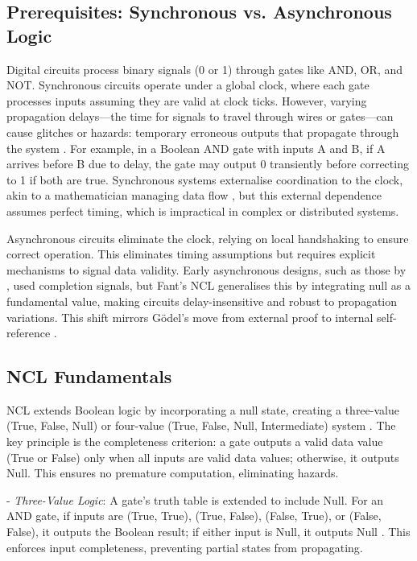 \documentclass{article}
\begin{document}
\subsection{Prerequisites: Synchronous vs. Asynchronous Logic}
Digital circuits process binary signals (0 or 1) through gates like AND, OR, and NOT. Synchronous circuits operate under a global clock, where each gate processes inputs assuming they are valid at clock ticks. However, varying propagation delays---the time for signals to travel through wires or gates---can cause glitches or hazards: temporary erroneous outputs that propagate through the system \citep{seitz1980}. For example, in a Boolean AND gate with inputs A and B, if A arrives before B due to delay, the gate may output 0 transiently before correcting to 1 if both are true. Synchronous systems externalise coordination to the clock, akin to a mathematician managing data flow \citep{fant2005}, but this external dependence assumes perfect timing, which is impractical in complex or distributed systems.

Asynchronous circuits eliminate the clock, relying on local handshaking to ensure correct operation. This eliminates timing assumptions but requires explicit mechanisms to signal data validity. Early asynchronous designs, such as those by \citet{seitz1980}, used completion signals, but Fant's NCL generalises this by integrating null as a fundamental value, making circuits delay-insensitive and robust to propagation variations. This shift mirrors G\"{o}del's move from external proof to internal self-reference \citep{godel1931}.

\subsection{NCL Fundamentals}
NCL extends Boolean logic by incorporating a null state, creating a three-value (True, False, Null) or four-value (True, False, Null, Intermediate) system \citep{fant2005}. The key principle is the completeness criterion: a gate outputs a valid data value (True or False) only when all inputs are valid data values; otherwise, it outputs Null. This ensures no premature computation, eliminating hazards.

- \textit{Three-Value Logic}: A gate's truth table is extended to include Null. For an AND gate, if inputs are (True, True), (True, False), (False, True), or (False, False), it outputs the Boolean result; if either input is Null, it outputs Null \citep{fant2005}. This enforces input completeness, preventing partial states from propagating.
\end{document}
